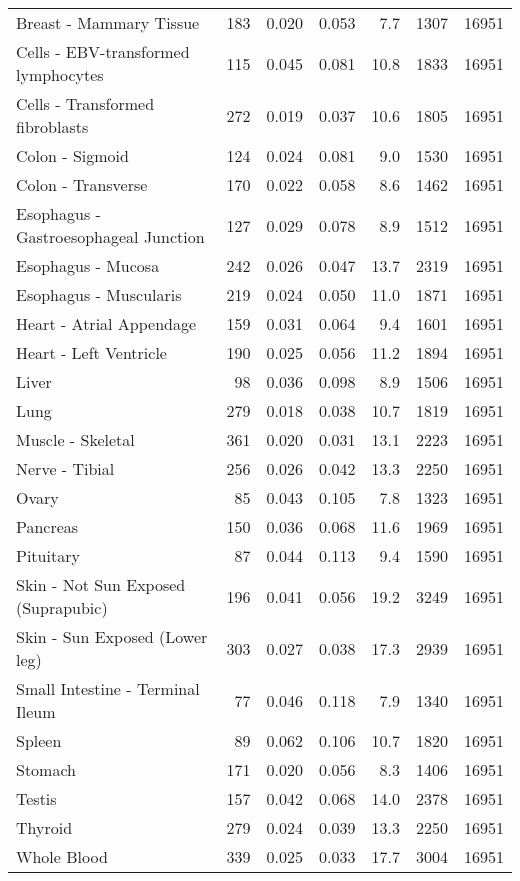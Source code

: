 \documentclass[10pt,letterpaper]{article}
\begin{document}
\begin{table}[!ht]
\begin{adjustwidth}{-2.25in}{0in}
\begin{tabular}{lrrrrrr}
  Breast - Mammary Tissue & 183 & 0.020 & 0.053 & 7.7 & 1307 & 16951 \\ 
  Cells - EBV-transformed lymphocytes & 115 & 0.045 & 0.081 & 10.8 & 1833 & 16951 \\ 
  Cells - Transformed fibroblasts & 272 & 0.019 & 0.037 & 10.6 & 1805 & 16951 \\ 
  Colon - Sigmoid & 124 & 0.024 & 0.081 & 9.0 & 1530 & 16951 \\ 
  Colon - Transverse & 170 & 0.022 & 0.058 & 8.6 & 1462 & 16951 \\ 
  Esophagus - Gastroesophageal Junction & 127 & 0.029 & 0.078 & 8.9 & 1512 & 16951 \\ 
  Esophagus - Mucosa & 242 & 0.026 & 0.047 & 13.7 & 2319 & 16951 \\ 
  Esophagus - Muscularis & 219 & 0.024 & 0.050 & 11.0 & 1871 & 16951 \\ 
  Heart - Atrial Appendage & 159 & 0.031 & 0.064 & 9.4 & 1601 & 16951 \\ 
  Heart - Left Ventricle & 190 & 0.025 & 0.056 & 11.2 & 1894 & 16951 \\ 
  Liver & 98 & 0.036 & 0.098 & 8.9 & 1506 & 16951 \\ 
  Lung & 279 & 0.018 & 0.038 & 10.7 & 1819 & 16951 \\ 
  Muscle - Skeletal & 361 & 0.020 & 0.031 & 13.1 & 2223 & 16951 \\ 
  Nerve - Tibial & 256 & 0.026 & 0.042 & 13.3 & 2250 & 16951 \\ 
  Ovary & 85 & 0.043 & 0.105 & 7.8 & 1323 & 16951 \\ 
  Pancreas & 150 & 0.036 & 0.068 & 11.6 & 1969 & 16951 \\ 
  Pituitary & 87 & 0.044 & 0.113 & 9.4 & 1590 & 16951 \\ 
  Skin - Not Sun Exposed (Suprapubic) & 196 & 0.041 & 0.056 & 19.2 & 3249 & 16951 \\ 
  Skin - Sun Exposed (Lower leg) & 303 & 0.027 & 0.038 & 17.3 & 2939 & 16951 \\ 
  Small Intestine - Terminal Ileum & 77 & 0.046 & 0.118 & 7.9 & 1340 & 16951 \\ 
  Spleen & 89 & 0.062 & 0.106 & 10.7 & 1820 & 16951 \\ 
  Stomach & 171 & 0.020 & 0.056 & 8.3 & 1406 & 16951 \\ 
  Testis & 157 & 0.042 & 0.068 & 14.0 & 2378 & 16951 \\ 
  Thyroid & 279 & 0.024 & 0.039 & 13.3 & 2250 & 16951 \\ 
  Whole Blood & 339 & 0.025 & 0.033 & 17.7 & 3004 & 16951 \\ 
   \hline
\end{tabular}
\end{adjustwidth}
\end{table}
\end{document}
